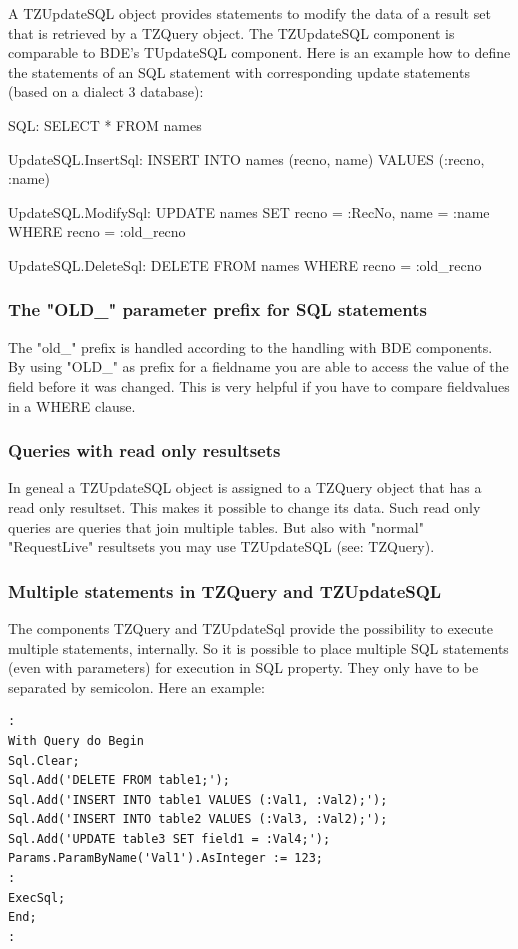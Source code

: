\documentclass[a4paper,12pt,oneside]{book}
\begin{document}
A TZUpdateSQL object provides statements to modify the data of a result set that is retrieved by a TZQuery object.
The TZUpdateSQL component is comparable to BDE's TUpdateSQL component.
Here is an example how to define the statements of an SQL statement with corresponding update statements (based on a dialect 3 database):

SQL: SELECT * FROM names

UpdateSQL.InsertSql: INSERT INTO names (recno, name) VALUES (:recno, :name)

UpdateSQL.ModifySql: UPDATE names SET recno = :RecNo, name = :name WHERE recno = :old\_recno

UpdateSQL.DeleteSql: DELETE FROM names WHERE recno = :old\_recno

\subsubsection{The "OLD\_" parameter prefix for SQL statements}

The "old\_" prefix is handled according to the handling with BDE components.
By using "OLD\_" as prefix for a fieldname you are able to access the value of the field before it was changed.
This is very helpful if you have to compare fieldvalues in a WHERE clause.

\subsubsection{Queries with read only resultsets}
In geneal a TZUpdateSQL object is assigned to a TZQuery object that has a read only resultset.
This makes it possible to change its data.
Such read only queries are queries that join multiple tables.
But also with "normal" "RequestLive" resultsets you may use TZUpdateSQL (see: TZQuery).

\subsubsection{Multiple statements in TZQuery and TZUpdateSQL}
The components TZQuery and TZUpdateSql provide the possibility to execute multiple statements, internally.
So it is possible to place multiple SQL statements (even with parameters) for execution in SQL property.
They only have to be separated by semicolon. Here an example:
\begin{verbatim}
:
With Query do Begin
Sql.Clear;
Sql.Add('DELETE FROM table1;');
Sql.Add('INSERT INTO table1 VALUES (:Val1, :Val2);');
Sql.Add('INSERT INTO table2 VALUES (:Val3, :Val2);');
Sql.Add('UPDATE table3 SET field1 = :Val4;');
Params.ParamByName('Val1').AsInteger := 123;
:
ExecSql;
End;
:
\end{verbatim}
\end{document}
